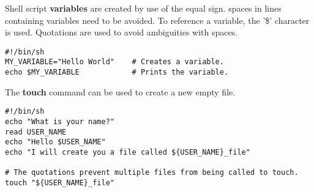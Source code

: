 Shell script \textbf{variables} are created by use of the equal sign. spaces in lines containing variables need to be avoided. To reference a variable, the '\$' character is used. Quotations are used to avoid ambiguities with spaces.
\begin{lstlisting}
#!/bin/sh
MY_VARIABLE="Hello World"    # Creates a variable.
echo $MY_VARIABLE            # Prints the variable.
\end{lstlisting}




The \textbf{touch} command can be used to create a new empty file.
\begin{lstlisting}
#!/bin/sh
echo "What is your name?"
read USER_NAME
echo "Hello $USER_NAME"
echo "I will create you a file called ${USER_NAME}_file"

# The quotations prevent multiple files from being called to touch.
touch "${USER_NAME}_file"
\end{lstlisting}